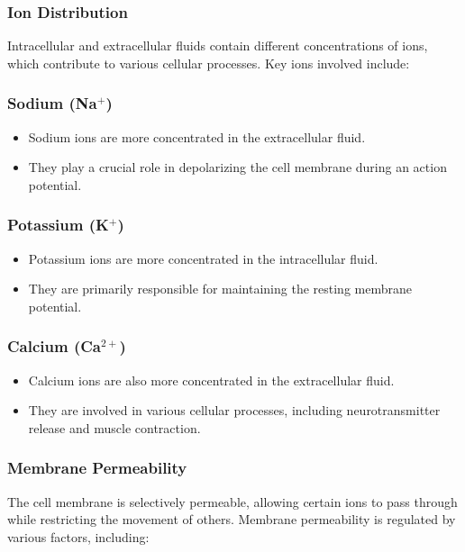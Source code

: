 \documentclass{article}
\begin{document}
\subsubsection{Ion Distribution}

Intracellular and extracellular fluids contain different concentrations of ions, which contribute to various cellular processes. Key ions involved include:

\subsubsection{Sodium (Na$^+$)}

\begin{itemize}
  \item Sodium ions are more concentrated in the extracellular fluid.
  \item They play a crucial role in depolarizing the cell membrane during an action potential.
\end{itemize}

\subsubsection{Potassium (K$^+$)}

\begin{itemize}
  \item Potassium ions are more concentrated in the intracellular fluid.
  \item They are primarily responsible for maintaining the resting membrane potential.
\end{itemize}

\subsubsection{Calcium (Ca$^{2+}$)}

\begin{itemize}
  \item Calcium ions are also more concentrated in the extracellular fluid.
  \item They are involved in various cellular processes, including neurotransmitter release and muscle contraction.
\end{itemize}

\subsubsection{Membrane Permeability}

The cell membrane is selectively permeable, allowing certain ions to pass through while restricting the movement of others. Membrane permeability is regulated by various factors, including:
\end{document}
